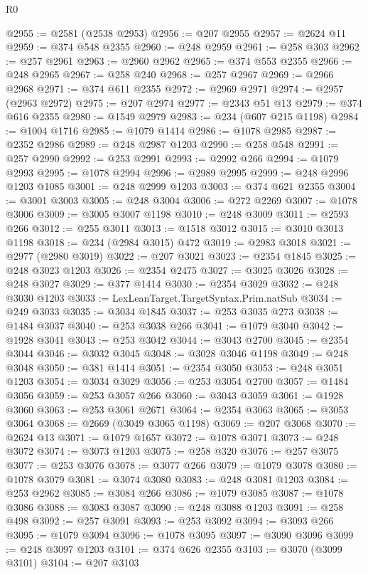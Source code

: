 \begin{lexlean}{R0}
\begin{coremodule}
@2955 := @2581 (@2538 @2953)
@2956 := @207 @2955
@2957 := @2624 @11
@2959 := @374 @548 @2355
@2960 := @248 @2959
@2961 := @258 @303
@2962 := @257 @2961
@2963 := @2960 @2962
@2965 := @374 @553 @2355
@2966 := @248 @2965
@2967 := @258 @240
@2968 := @257 @2967
@2969 := @2966 @2968
@2971 := @374 @611 @2355
@2972 := @2969 @2971
@2974 := @2957 (@2963 @2972)
@2975 := @207 @2974
@2977 := @2343 @51 @13
@2979 := @374 @616 @2355
@2980 := @1549 @2979
@2983 := @234 (@607 @215 @1198)
@2984 := @1004 @1716
@2985 := @1079 @1414
@2986 := @1078 @2985
@2987 := @2352 @2986
@2989 := @248 @2987 @1203
@2990 := @258 @548
@2991 := @257 @2990
@2992 := @253 @2991
@2993 := @2992 @266
@2994 := @1079 @2993
@2995 := @1078 @2994
@2996 := @2989 @2995
@2999 := @248 @2996 @1203 @1085
@3001 := @248 @2999 @1203
@3003 := @374 @621 @2355
@3004 := @3001 @3003
@3005 := @248 @3004
@3006 := @272 @2269
@3007 := @1078 @3006
@3009 := @3005 @3007 @1198
@3010 := @248 @3009
@3011 := @2593 @266
@3012 := @255 @3011
@3013 := @1518 @3012
@3015 := @3010 @3013 @1198
@3018 := @234 (@2984 @3015) @472
@3019 := @2983 @3018
@3021 := @2977 (@2980 @3019)
@3022 := @207 @3021
@3023 := @2354 @1845
@3025 := @248 @3023 @1203
@3026 := @2354 @2475
@3027 := @3025 @3026
@3028 := @248 @3027
@3029 := @377 @1414
@3030 := @2354 @3029
@3032 := @248 @3030 @1203
@3033 := LexLeanTarget.TargetSyntax.Prim.natSub
@3034 := @249 @3033
@3035 := @3034 @1845
@3037 := @253 @3035 @273
@3038 := @1484 @3037
@3040 := @253 @3038 @266
@3041 := @1079 @3040
@3042 := @1928 @3041
@3043 := @253 @3042
@3044 := @3043 @2700
@3045 := @2354 @3044
@3046 := @3032 @3045
@3048 := @3028 @3046 @1198
@3049 := @248 @3048
@3050 := @381 @1414
@3051 := @2354 @3050
@3053 := @248 @3051 @1203
@3054 := @3034 @3029
@3056 := @253 @3054 @2700
@3057 := @1484 @3056
@3059 := @253 @3057 @266
@3060 := @3043 @3059
@3061 := @1928 @3060
@3063 := @253 @3061 @2671
@3064 := @2354 @3063
@3065 := @3053 @3064
@3068 := @2669 (@3049 @3065 @1198)
@3069 := @207 @3068
@3070 := @2624 @13
@3071 := @1079 @1657
@3072 := @1078 @3071
@3073 := @248 @3072
@3074 := @3073 @1203
@3075 := @258 @320
@3076 := @257 @3075
@3077 := @253 @3076
@3078 := @3077 @266
@3079 := @1079 @3078
@3080 := @1078 @3079
@3081 := @3074 @3080
@3083 := @248 @3081 @1203
@3084 := @253 @2962
@3085 := @3084 @266
@3086 := @1079 @3085
@3087 := @1078 @3086
@3088 := @3083 @3087
@3090 := @248 @3088 @1203
@3091 := @258 @498
@3092 := @257 @3091
@3093 := @253 @3092
@3094 := @3093 @266
@3095 := @1079 @3094
@3096 := @1078 @3095
@3097 := @3090 @3096
@3099 := @248 @3097 @1203
@3101 := @374 @626 @2355
@3103 := @3070 (@3099 @3101)
@3104 := @207 @3103

\end{coremodule}
\end{lexlean}
